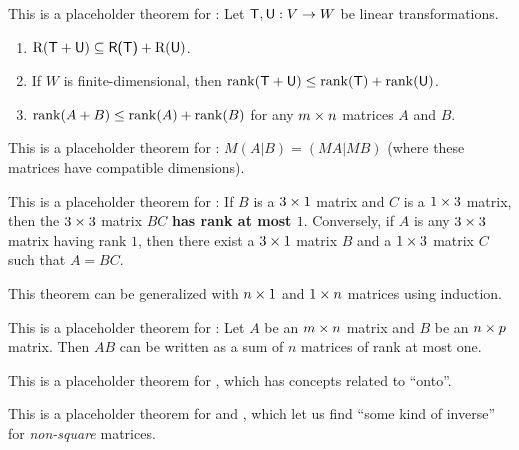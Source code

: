 \begin{additional theorem} \label{athm 3.6}
This is a placeholder theorem for :
Let \(\textsf{T}, \textsf{U}: V \to W\) be linear transformations.
\begin{enumerate}
\item \(\mathrm{R}(\textsf{T} + \textsf{U}) \subseteq \textsf{R(T)} + \mathrm{R}(\textsf{U})\).
\item If \(W\) is finite-dimensional, then \(\mathrm{rank}(\textsf{T} + \textsf{U}) \le \mathrm{rank}(\textsf{T}) + \mathrm{rank}(\textsf{U})\).
\item \(\mathrm{rank}(A + B) \le \mathrm{rank}(A) + \mathrm{rank}(B)\) for any \(m \times n\) matrices \(A\) and \(B\).
\end{enumerate}
\end{additional theorem}

\begin{additional theorem} \label{athm 3.7}
\sloppy This is a placeholder theorem for :
\(M(A|B) = (MA|MB)\) (where these matrices have compatible dimensions).
\end{additional theorem}

\begin{additional theorem} \label{athm 3.8}
This is a placeholder theorem for :
If \(B\) is a \(3 \times 1\) matrix and \(C\) is a \(1 \times 3\) matrix, then the \(3 \times 3\) matrix \(BC\) \textbf{has rank at most \(1\)}.
Conversely, if \(A\) is any \(3 \times 3\) matrix having rank \(1\), then there exist a \(3 \times 1\) matrix \(B\) and a \(1 \times 3\) matrix \(C\) such that \(A = BC\).

This theorem can be generalized with \(n \times 1\) and \(1 \times n\) matrices using induction.
\end{additional theorem}

\begin{additional theorem} \label{athm 3.9}
This is a placeholder theorem for :
Let \(A\) be an \(m \times n\) matrix and \(B\) be an \(n \times p\) matrix.
Then \(AB\) can be written as a sum of \(n\) matrices of rank at most one.
\end{additional theorem}

\begin{additional theorem} \label{athm 3.10}
This is a placeholder theorem for , which has concepts related to ``onto''.
\end{additional theorem}

\begin{additional theorem} \label{athm 3.11}
This is a placeholder theorem for  and , which let us find ``some kind of inverse'' for \emph{non-square} matrices.
\end{additional theorem}